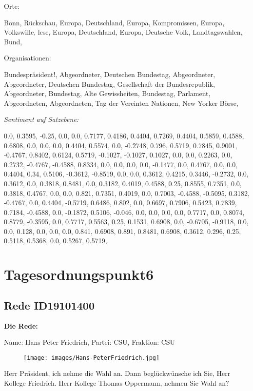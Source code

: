 \documentclass[10pt, a4paper]{report}
\begin{document}
Orte:

Bonn, Rückschau, Europa, Deutschland, Europa, Kompromissen, Europa, Volkswille, lese, Europa, Deutschland, Europa, Deutsche Volk, Landtagswahlen, Bund, 

Organisationen:

Bundespräsident!, Abgeordneter, Deutschen Bundestag, Abgeordneter, Abgeordneter, Deutschen Bundestag, Gesellschaft der Bundesrepublik, Abgeordneter, Bundestag, Alte Gewissheiten, Bundestag, Parlament, Abgeordneten, Abgeordneten, Tag der Vereinten Nationen, New Yorker Börse, 

\textit{Sentiment auf Satzebene:}

0.0, 0.3595, -0.25, 0.0, 0.0, 0.7177, 0.4186, 0.4404, 0.7269, 0.4404, 0.5859, 0.4588, 0.6808, 0.0, 0.0, 0.0, 0.4404, 0.5574, 0.0, -0.2748, 0.796, 0.5719, 0.7845, 0.9001, -0.4767, 0.8402, 0.6124, 0.5719, -0.1027, -0.1027, 0.1027, 0.0, 0.0, 0.2263, 0.0, 0.2732, -0.4767, -0.4588, 0.8334, 0.0, 0.0, 0.0, 0.0, -0.1477, 0.0, 0.4767, 0.0, 0.0, 0.4404, 0.34, 0.5106, -0.3612, -0.8519, 0.0, 0.0, 0.3612, 0.4215, 0.3446, -0.2732, 0.0, 0.3612, 0.0, 0.3818, 0.8481, 0.0, 0.3182, 0.4019, 0.4588, 0.25, 0.8555, 0.7351, 0.0, 0.3818, 0.4767, 0.0, 0.0, 0.821, 0.7351, 0.4019, 0.0, 0.7003, -0.4588, -0.5095, 0.3182, -0.4767, 0.0, 0.4404, -0.5719, 0.6486, 0.802, 0.0, 0.6697, 0.7906, 0.5423, 0.7839, 0.7184, -0.4588, 0.0, -0.1872, 0.5106, -0.046, 0.0, 0.0, 0.0, 0.0, 0.7717, 0.0, 0.8074, 0.8779, -0.3595, 0.0, 0.7717, 0.5563, 0.25, 0.1531, 0.6908, 0.0, -0.6705, -0.9118, 0.0, 0.0, 0.128, 0.0, 0.0, 0.0, 0.841, 0.6908, 0.891, 0.8481, 0.6908, 0.3612, 0.296, 0.25, 0.5118, 0.5368, 0.0, 0.5267, 0.5719, 
\section{Tagesordnungspunkt6}
\subsection{Rede ID19101400}

\textbf{Die Rede:}

Name: Hans-Peter Friedrich, Partei: CSU, Fraktion: CSU

\begin{figure}[!ht]
\texttt{[image: images/Hans-PeterFriedrich.jpg]}
\end{figure}


Herr Präsident, ich nehme die Wahl an. Dann beglückwünsche ich Sie, Herr Kollege Friedrich. Herr Kollege Thomas Oppermann, nehmen Sie Wahl an? 
\end{document}
